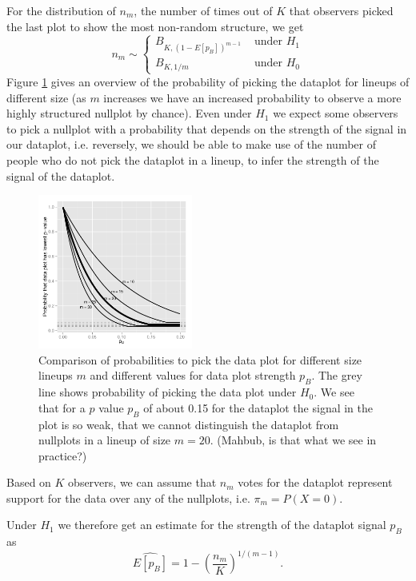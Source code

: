 \documentclass[11pt]{article}
\begin{document}
For the distribution of $n_m$, the number of times out of $K$ that observers picked the last plot to show the most non-random structure, we get
\[
n_m\sim \left \{ 
\begin{array}{cl}
B_{K, (1-E[p_B])^{m-1}} & \text { under } H_1\\
B_{K, 1/m} & \text { under } H_0
\end{array}
\right .
\]
Figure \ref{power} gives an overview of the probability of picking the dataplot for lineups of different size (as $m$ increases we have an increased probability to observe a more highly structured nullplot by chance).
Even under $H_1$ we expect some observers to pick a nullplot with a probability that depends on the strength of the signal in our dataplot, i.e. reversely, we should be able to make use of the number of people who do not pick the dataplot in a lineup, to infer the strength of the signal of the dataplot.

\begin{figure}[htbp] %
   \centering
   \includegraphics[width=2in]{images/powerplot.pdf} 
   \caption{Comparison of probabilities to pick the data plot for different size lineups $m$ and different values for data plot strength $p_B$. The grey line shows probability of picking the data plot under $H_0$. We see that for a $p$ value $p_B$ of about 0.15 for the dataplot the signal in the plot is so weak, that we cannot distinguish the dataplot from nullplots in a lineup of size $m=20$. (Mahbub, is that what we see in practice?)}
   \label{power}
\end{figure}
Based on $K$ observers, we can assume that $n_m$ votes for the dataplot represent support for the data over any of the nullplots, i.e. $\pi_m = P(X=0)$.

Under $H_1$ we therefore get an estimate for the strength of the dataplot signal $p_B$ as
\[
\widehat{E[p_B]} = 1 - \left( \frac{n_m}{K} \right)^{1/(m-1)}.
\]
\end{document}
